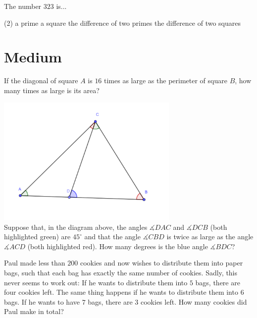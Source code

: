\documentclass{article}
\renewcommand{\angle}{\measuredangle}
\begin{document}
\begin{problem}
The number $323$ is...
\begin{tasks2}(2)
\task a prime
\task a square
\task the difference of two primes
\task the difference of two squares
\end{tasks2}
\end{problem}

\newpage
\section{Medium}

\begin{problem}
If the diagonal of square $A$ is $16$ times as large as the perimeter of square $B$, how many times as large is its area?
\end{problem}

\begin{problem}
\includegraphics[width=250pt]{img11.png} \\
Suppose that, in the diagram above, the angles $\angle DAC$ and $\angle DCB$ (both highlighted green) are $45^{\circ}$ and that the angle $\angle CBD$ is twice as large as the angle $\angle ACD$ (both highlighted red). How many degrees is the blue angle $\angle BDC$?
\end{problem}

\begin{problem}
Paul made less than $200$ cookies and now wishes to distribute them into paper bags, such that each bag has exactly the same number of cookies. Sadly, this never seems to work out: If he wants to distribute them into $5$ bags, there are four cookies left. The same thing happens if he wants to distribute them into $6$ bags. If he wants to have $7$ bags, there are $3$ cookies left. How many cookies did Paul make in total?
\end{problem}
\end{document}
